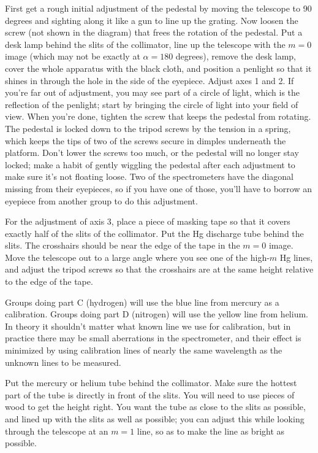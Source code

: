 First get a rough initial adjustment of the pedestal by moving the telescope to 90 degrees
and sighting along it like a gun to line up the grating.
Now loosen the screw (not shown in the diagram) that frees the rotation of the pedestal.
Put a desk lamp behind the slits of the collimator, line up the telescope with
the $m=0$ image (which may not be exactly at $\alpha=180$ degrees), remove the desk
lamp, cover the whole apparatus with the black cloth, and position a penlight
so that it shines in through the hole in the side of the eyepiece. Adjust axes
1 and 2. If you're far out of adjustment, you may see part of a circle of light,
which is the reflection of the penlight; start by bringing the circle of light
into your field of view. When you're done, tighten the screw that keeps the pedestal
from rotating. The pedestal is locked down to the tripod screws by the tension in
a spring, which keeps the tips of two of the screws secure in dimples underneath the
platform. Don't lower the screws too much, or the pedestal will no longer
stay locked; make a habit of gently wiggling the pedestal after each adjustment
to make sure it's not floating loose. Two of the spectrometers have the diagonal
missing from their eyepieces, so if you have one of those, you'll have to borrow
an eyepiece from another group to do this adjustment.

For the adjustment of axis 3, place a piece of masking tape so that it covers exactly
half of the slits of the collimator. Put the Hg discharge tube behind the slits.
The crosshairs should be near the edge of the tape in the $m=0$ image. Move the telescope out to
a large angle where you see one of the high-$m$ Hg lines, and adjust the tripod screws
so that the crosshairs are at the same height relative to the edge of the tape.


Groups doing part C (hydrogen) will use the blue line from mercury as a calibration.
Groups doing part D (nitrogen) will use the yellow line from helium.
In theory it shouldn't matter what known line we use for calibration, but in practice
there may be small aberrations in the spectrometer, and their effect is minimized by
using calibration lines of nearly the same wavelength as the unknown lines to be measured.

Put the mercury or helium tube behind the collimator. Make sure the
hottest part of the tube is directly in
front of the slits. You will need to use pieces of wood to get the height right.
You want the tube as close to the slits as possible, and
lined up with the slits as well as possible; you can adjust
this while looking through the telescope at an $m=1$ line,
so as to make the line as bright as possible.

